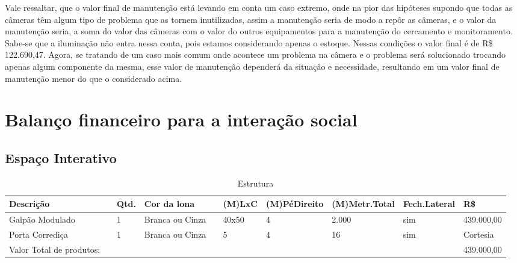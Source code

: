 Vale ressaltar, que o valor final de manutenção está levando em conta um caso extremo, onde na pior das hipóteses supondo que todas as câmeras têm algum tipo de problema que as tornem inutilizadas, assim a manutenção seria de modo a repôr as câmeras, e o valor da manutenção seria, a soma do valor das câmeras com o valor do outros equipamentos para a manutenção do cercamento e monitoramento. Sabe-se que a iluminação não entra nessa conta, pois estamos considerando apenas o estoque. Nessas condições o valor final é de R\$ 122.690,47. Agora, se tratando de um caso mais comum onde acontece um problema na câmera e o problema será solucionado trocando apenas algum componente da mesma, esse valor de manutenção dependerá da situação e necessidade, resultando em um valor final de manutenção menor do que o considerado acima.
\section{Balanço financeiro para a interação social}

\subsection{Espaço Interativo}

\begin{table}[h]
\centering
\caption{Estrutura}
\label{Estrutura}
\begin{tabular}{llllllllll} \\ \hline 
Descrição                &  & Qtd. & Cor da lona     &  & (M)LxC & (M)PéDireito & (M)Metr.Total & Fech.Lateral & R\$        \\ \hline 
Galpão Modulado          &  & 1    & Branca ou Cinza &  & 40x50  & 4            & 2.000         & sim          & 439.000,00 \\ \hline 
Porta Corrediça          &  & 1    & Branca ou Cinza &  & 5      & 4            & 16            & sim          & Cortesia   \\ \hline 
Valor Total de produtos: &  &      &                 &  &        &              &               &              & 439.000,00 \\ \hline 
\end{tabular}
\end{table}


